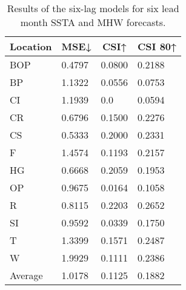 \documentclass[11pt, a4paper]{article}
\begin{document}
\begin{table}[H]
\centering
\small
\caption{Results of the six-lag models for six lead month SSTA and MHW forecasts.}
\begin{tabular}{llll}
\multicolumn{1}{c}{\textbf{Location}} & \multicolumn{1}{c}{\textbf{MSE↓}} & \multicolumn{1}{c}{\textbf{CSI↑}} & \multicolumn{1}{c}{\textbf{CSI 80↑}} \\ \hline
BOP                         & 0.4797                            & 0.0800                            & 0.2188                               \\
BP                        & 1.1322                            & 0.0556                            & 0.0753                               \\
CI                        & 1.1939                            & 0.0                               & 0.0594                               \\
CR                           & 0.6796                            & 0.1500                            & 0.2276                               \\
CS                           & 0.5333                            & 0.2000                            & 0.2331                               \\
F                             & 1.4574                            & 0.1193                            & 0.2157                               \\
HG                          & 0.6668                            & 0.2059                            & 0.1953                               \\
OP                       & 0.9675                            & 0.0164                            & 0.1058                               \\
R                                & 0.8115                            & 0.2203                            & 0.2652                               \\
SI                        & 0.9592                            & 0.0339                            & 0.1750                               \\
T                              & 1.3399                            & 0.1571                            & 0.2487                               \\
W                             & 1.9929                            & 0.1111                            & 0.2386                               \\ \hline
Average                               & 1.0178                            & 0.1125                            & 0.1882
\end{tabular}
\end{table}
\end{document}
